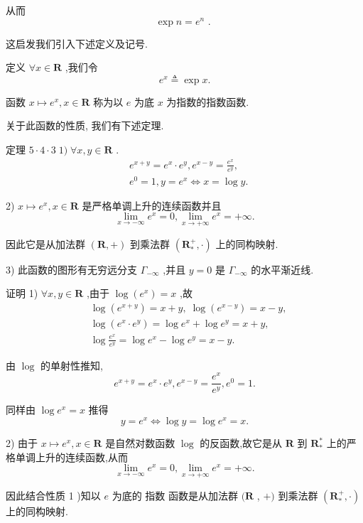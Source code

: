 从而
$$\exp n = {e}^{n}\text{ . }$$

这启发我们引入下述定义及记号.

定义 $\forall x \in  \mathbf{R}$ ,我们令
$${e}^{x} \triangleq  \exp x.$$

函数 $x \mapsto  {e}^{x},x \in  \mathbf{R}$ 称为以 $e$ 为底 $x$ 为指数的指数函数.

关于此函数的性质, 我们有下述定理.

定理 $5 \cdot  4 \cdot  3\;1)\;\forall x,y \in  \mathbf{R}$ .
\begin{align*}
	&{e}^{x + y} = {e}^{x} \cdot  {e}^{y},{e}^{x - y} = \frac{{e}^{x}}{{e}^{y}},\\
	&{e}^{0} = 1,y = {e}^{x} \Leftrightarrow  x = \log y.
\end{align*}

2) $x \mapsto  {e}^{x},x \in  \mathbf{R}$ 是严格单调上升的连续函数并且
$$\mathop{\lim }\limits_{{x \rightarrow   - \infty }}{e}^{x} = 0,\mathop{\lim }\limits_{{x \rightarrow   + \infty }}{e}^{x} =  + \infty .$$

因此它是从加法群 $\left( {\mathbf{R}, + }\right)$ 到乘法群 $\left( {{\mathbf{R}}_{ * }^{ + }, \cdot  }\right)$ 上的同构映射.

3) 此函数的图形有无穷远分支 ${\Gamma }_{-\infty }$ ,并且 $y = 0$ 是 ${\Gamma }_{-\infty }$ 的水平渐近线.

证明 1) $\forall x,y \in  \mathbf{R}$ ,由于 $\log \left( {e}^{x}\right)  = x$ ,故
\begin{align*}
	&\log \left( {e}^{x + y}\right)  = x + y,\;\log \left( {e}^{x - y}\right)  = x - y,\\
	&\log \left( {{e}^{x} \cdot  {e}^{y}}\right)  = \log {e}^{x} + \log {e}^{y} = x + y,\\
	&\log \frac{{e}^{x}}{{e}^{y}} = \log {e}^{x} - \log {e}^{y} = x - y.
\end{align*}

由 $\log$ 的单射性推知,
$${e}^{x + y} = {e}^{x} \cdot  {e}^{y},{e}^{x - y} = \frac{{e}^{x}}{{e}^{y}},{e}^{0} = 1.$$

同样由 $\log {e}^{x} = x$ 推得
$$y = {e}^{x} \Leftrightarrow  \log y = \log {e}^{x} = x.$$

2) 由于 $x \mapsto  {e}^{x},x \in  \mathbf{R}$ 是自然对数函数 $\log$ 的反函数,故它是从 $\mathbf{R}$ 到 ${\mathbf{R}}_{ * }^{ * }$ 上的严格单调上升的连续函数,从而
$$\mathop{\lim }\limits_{{x \rightarrow   - \infty }}{e}^{x} = 0,\mathop{\lim }\limits_{{x \rightarrow   + \infty }}{e}^{x} =  + \infty .$$

因此结合性质 1 )知以 $e$ 为底的 指数 函数是从加法群 $(\mathbf{R}$ , $+ )$ 到乘法群 $\left( {{\mathbf{R}}_{ * }^{ + }, \cdot  }\right)$ 上的同构映射.

